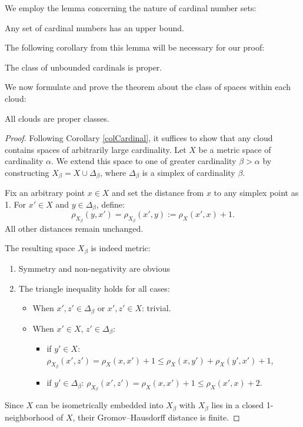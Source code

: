 \documentclass[leqno]{article}
\begin{document}
We employ the lemma concerning the nature of cardinal number sets:

\begin{lemma}
    Any set of cardinal numbers has an upper bound.
\end{lemma}

The following corollary from this lemma will be necessary for our proof:

\begin{corollary}\label{colCardinal}
    The class of unbounded cardinals is proper.
\end{corollary}

We now formulate and prove the theorem about the class of spaces
within each cloud:

\begin{theorem}
    All clouds are proper classes.
\end{theorem}

\begin{proof}
    Following Corollary \ref{colCardinal}, it suffices to show that any
    cloud contains spaces of arbitrarily large cardinality. Let $X$ be
    a metric space of cardinality $\alpha$. We extend this space to one
    of greater cardinality $\beta > \alpha$ by constructing $X_\beta =
    X \cup \Delta_\beta$, where $\Delta_\beta$ is a simplex of
    cardinality $\beta$.

    Fix an arbitrary point $x \in X$ and set the distance from $x$ to
    any simplex point as 1. For $x' \in X$ and $y \in \Delta_\beta$, define:
    $$
    \rho_{X_\beta}(y,x') = \rho_{X_\beta}(x',y) := \rho_X(x',x) + 1.
    $$
    All other distances remain unchanged.

    The resulting space $X_\beta$ is indeed metric:
    \begin{enumerate}
        \item Symmetry and non-negativity are obvious
        \item The triangle inequality holds for all cases:
            \begin{itemize}
                \item When $x', z' \in \Delta_\beta$ or $x', z' \in X$: trivial.
                \item When $x' \in X$, $z' \in \Delta_\beta$:
                    \begin{itemize}
                        \item if $y' \in X$: $\rho_{X_\beta}(x',z') =
                            \rho_X(x,x') + 1 \leq \rho_X(x,y') +
                            \rho_X(y',x') + 1$,
                        \item if $y' \in \Delta_\beta$: $\rho_{X_\beta}(x',z') =
                            \rho_X(x,x') + 1 \leq \rho_X(x',x) + 2$.
                    \end{itemize}
            \end{itemize}
    \end{enumerate}

    Since $X$ can be isometrically embedded into $X_\beta$ with
    $X_\beta$ lies in a closed 1-neighborhood of $X$, their
    Gromov--Hausdorff distance is finite.
\end{proof}
\end{document}
